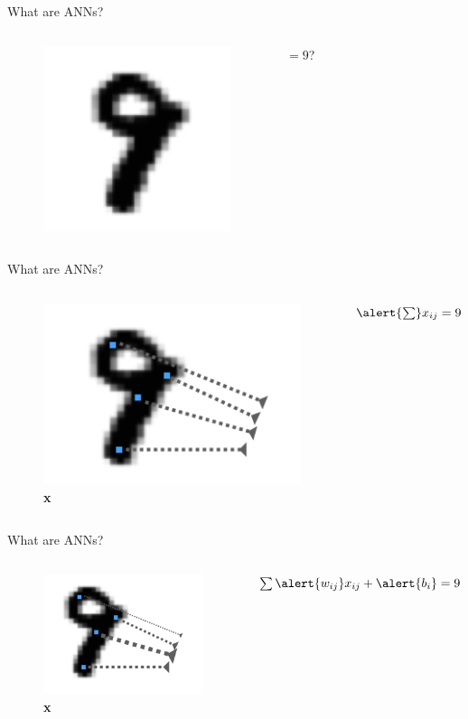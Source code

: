 \documentclass[10pt]{beamer}
\begin{document}
\begin{frame}[fragile]{What are ANNs?}
\begin{columns}
\begin{figure}
    \centering
    \includegraphics[scale=0.5]{images/nine_only.png} 
\end{figure}
\centering
 $= 9$?
\end{columns}
\end{frame}


\begin{frame}[fragile]{What are ANNs?}
\begin{columns}
\centering
\begin{figure}
    \centering
    \includegraphics[scale=0.5]{images/nine_x.png} 
    \caption{\textbf{x}}
\end{figure}
\centering
 $\alert{\sum} x_{ij} = 9$
\end{columns}
\end{frame}

\begin{frame}[fragile]{What are ANNs?}
\begin{columns}
\begin{figure}
    \centering
    \includegraphics[scale=0.5]{images/nine_wx.png} 
    \caption{\textbf{x}}
\end{figure}
\centering
 $\sum \alert{w_{ij}} x_{ij} + \alert{b_i} = 9$
\end{columns}
\end{frame}
\end{document}
